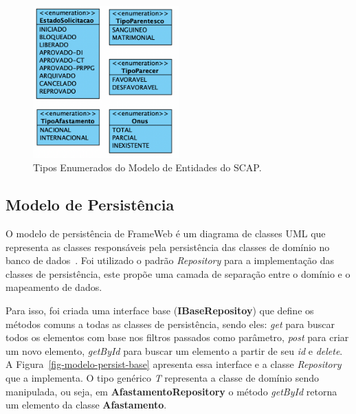 \begin{figure}
    \centering
    \includegraphics[width=0.5\textwidth]{figuras/fig-modelo-entidades-enum.png}
    \caption{Tipos Enumerados do Modelo de Entidades do SCAP.}
    \label{fig-modelo-entidades-enum}
\end{figure}


\subsection{Modelo de Persistência}
\label{subsec-frameweb-persistencia}

O modelo de persistência de FrameWeb é um diagrama de classes UML que representa
as classes responsáveis pela persistência das classes de domínio no banco de dados~\cite{souza:2007}.
Foi utilizado o padrão \textit{Repository} para a implementação das classes de persistência,
este propõe uma camada de separação entre o domínio e o mapeamento de dados.



Para isso, foi criada uma interface base (\textbf{IBaseRepositoy}) que define os métodos comuns a todas as classes de persistência,
sendo eles: \textit{get} para buscar todos os elementos com base nos filtros passados como parâmetro,
\textit{post} para criar um novo elemento, \textit{getById} para buscar um elemento a partir de seu
\textit{id} e \textit{delete}. A Figura~\ref{fig-modelo-persist-base} apresenta essa interface e a
classe \textit{Repository} que a implementa. O tipo genérico \textit{T} representa a classe de domínio
sendo manipulada, ou seja, em \textbf{AfastamentoRepository} o método \textit{getById}
retorna um elemento da classe \textbf{Afastamento}.


